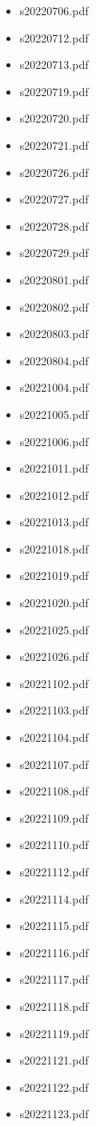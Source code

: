 \documentclass[a4paper,12pt,twoside]{book}
\begin{document}
\begin{itemize}
  \item s20220706.pdf
  \item s20220712.pdf
  \item s20220713.pdf
  \item s20220719.pdf
  \item s20220720.pdf
  \item s20220721.pdf
  \item s20220726.pdf
  \item s20220727.pdf
  \item s20220728.pdf
  \item s20220729.pdf
  \item s20220801.pdf
  \item s20220802.pdf
  \item s20220803.pdf
  \item s20220804.pdf
  \item s20221004.pdf
  \item s20221005.pdf
  \item s20221006.pdf
  \item s20221011.pdf
  \item s20221012.pdf
  \item s20221013.pdf
  \item s20221018.pdf
  \item s20221019.pdf
  \item s20221020.pdf
  \item s20221025.pdf
  \item s20221026.pdf
  \item s20221102.pdf
  \item s20221103.pdf
  \item s20221104.pdf
  \item s20221107.pdf
  \item s20221108.pdf
  \item s20221109.pdf
  \item s20221110.pdf
  \item s20221112.pdf
  \item s20221114.pdf
  \item s20221115.pdf
  \item s20221116.pdf
  \item s20221117.pdf
  \item s20221118.pdf
  \item s20221119.pdf
  \item s20221121.pdf
  \item s20221122.pdf
  \item s20221123.pdf

\end{itemize}
\end{document}
